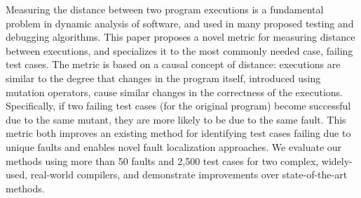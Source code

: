 Measuring the distance between two program executions is a fundamental problem in dynamic analysis of software, and used in many proposed testing and debugging algorithms.  This paper proposes a novel metric for measuring distance between executions, and specializes it to the most commonly needed case, failing test cases.  The metric is based on a causal concept of distance: executions are similar to the degree that changes in the program itself, introduced using mutation operators, cause similar changes in the correctness of the executions.  Specifically, if two failing test cases (for the original program) become successful due to the same mutant, they are more likely to be due to the same fault.  This metric both improves an existing method for identifying test cases failing due to unique faults and enables novel fault localization approaches.  We evaluate our methods using more than 50 faults and 2,500 test cases for two complex, widely-used, real-world compilers, and demonstrate improvements over state-of-the-art methods.  